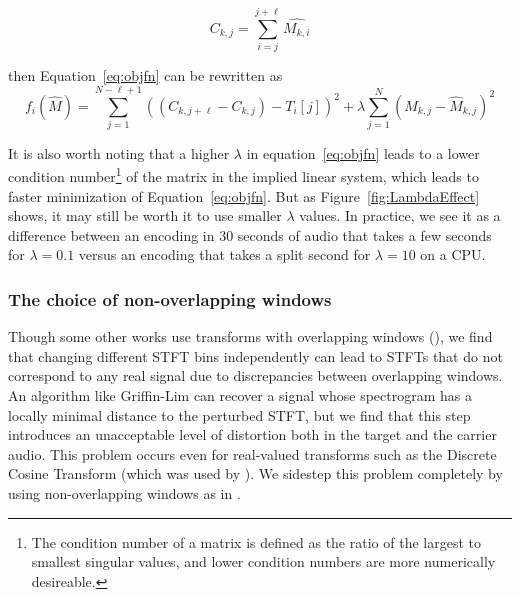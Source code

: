 \documentclass[runningheads]{llncs}
\begin{document}
\begin{equation}
  \label{eq:cumusum}
  C_{k, j} = \sum_{i=j}^{j+\ell} \hat{M_{k, i}}
\end{equation}

then Equation~\ref{eq:objfn} can be rewritten as 
\begin{equation}
  \label{eq:objfncumusum}
  f_i(\hat{M}) = \sum_{j=1}^{N-\ell+1} \left( (C_{k, j+\ell}-C_{k, j}) - T_i[j] \right)^2 + \lambda \sum_{j=1}^N \left( M_{k, j} - \hat{M}_{k, j} \right)^2
\end{equation}


It is also worth noting that a higher $\lambda$ in equation~\ref{eq:objfn} leads to a lower condition number\footnote{The condition number of a matrix is defined as the ratio of the largest to smallest singular values, and lower condition numbers are more numerically desireable.} of the matrix in the implied linear system, which leads to faster minimization of Equation~\ref{eq:objfn}.  But as Figure~\ref{fig:LambdaEffect} shows, it may still be worth it to use smaller $\lambda$ values.  In practice, we see it as a difference between an encoding in 30 seconds of audio that takes a few seconds for $\lambda=0.1$ versus an encoding that takes a split second for $\lambda=10$ on a CPU.



\subsubsection{The choice of non-overlapping windows}
Though some other works use transforms with overlapping windows (\cite{hwan_sik_yun_acoustic_2010,geleta_pixinwav_2021}), we find that changing different STFT bins independently can lead to STFTs that do not correspond to any real signal due to discrepancies between overlapping windows.  An algorithm like Griffin-Lim \cite{griffin1984signal} can recover a signal whose spectrogram has a locally minimal distance to the perturbed STFT, but we find that this step introduces an unacceptable level of distortion both in the target and the carrier audio.  This problem occurs even for real-valued transforms such as the Discrete Cosine Transform (which was used by \cite{geleta_pixinwav_2021}).  We sidestep this problem completely by using non-overlapping windows as in \cite{xiaoxiao_dong_data_2004}.  
\end{document}
